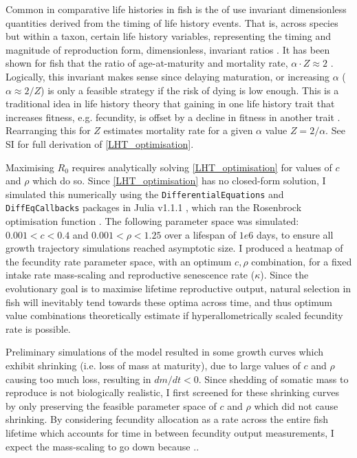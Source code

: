 \documentclass[a4paper]{article} %
\begin{document}
Common in comparative life histories in fish is the of use invariant dimensionless quantities derived from the timing of life history events. That is, across species but within a taxon, certain life history variables, representing the timing and magnitude of reproduction form, dimensionless, invariant ratios \autocite{Charnov1990-invariant, Charnov1993, Prince2015}. It has been shown for fish that the ratio of age-at-maturity and mortality rate, $\alpha\cdot Z \approx 2$ \autocite{Charnov1993}. Logically, this invariant makes sense since delaying maturation, or increasing $\alpha$ ($\alpha \approx 2/Z$) is only a feasible strategy if the risk of dying is low enough. This is a traditional idea in life history theory that gaining in one life history trait that increases fitness, e.g. fecundity, is offset by a decline in fitness in another trait \autocite{Charlesworth1980, stearns1992evolution, Roff2006}. Rearranging this for $Z$ estimates mortality rate for a given $\alpha$ value $Z = 2/\alpha$.
See SI for full derivation of \cref{LHT_optimisation}.

Maximising $R_0$ requires analytically solving \cref{LHT_optimisation} for values of $c$ and $\rho$ which do so. Since \cref{LHT_optimisation} has no closed-form solution, I simulated this numerically using the \texttt{DifferentialEquations} and \texttt{DiffEqCallbacks} packages in Julia v1.1.1 \autocite{Bezanson2017}, which ran the Rosenbrock optimisation function \autocite{Rosenbrock1960}. The following parameter space was simulated: $0.001 < c < 0.4$ \autocite{Roff1983, Enberg2008, Atiqulla2013} and $0.001 < \rho < 1.25$ over a lifespan of $1e6$ days, to ensure all growth trajectory simulations reached asymptotic size. I produced a heatmap of the fecundity rate parameter space, with an optimum $c, \rho$ combination, for a fixed intake rate mass-scaling and reproductive senescence rate ($\kappa$). Since the evolutionary goal is to maximise lifetime reproductive output, natural selection in fish will inevitably tend towards these optima across time, and thus optimum value combinations theoretically estimate if hyperallometrically scaled fecundity rate is possible.

Preliminary simulations of the model resulted in some growth curves which exhibit shrinking (i.e. loss of mass at maturity), due to large values of $c$ and $\rho$ causing too much loss, resulting in $dm/dt < 0$. Since shedding of somatic mass to reproduce is not biologically realistic, I first screened for these shrinking curves by only preserving the feasible parameter space of $c$ and $\rho$ which did not cause shrinking.
By considering fecundity allocation as a rate across the entire fish lifetime which accounts for time in between fecundity output measurements, I expect the mass-scaling to go down because ..
\end{document}
